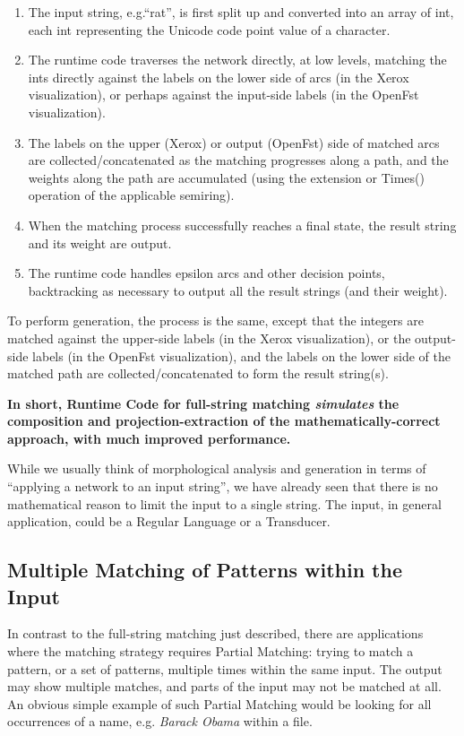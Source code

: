 \documentclass[letterpaper,12pt]{article}
\begin{document}
\begin{enumerate}
\item
The input string, e.g.\@ ``rat'',  is first split up and converted into an array of int, each int representing the Unicode code
point value of a character.
\item
The runtime code traverses the network directly, at low levels, matching the ints directly against the labels on
the lower side of arcs (in the Xerox visualization), or perhaps against the input-side labels (in the OpenFst
visualization).
\item
The labels on the upper (Xerox) or output (OpenFst) side of matched arcs are collected/concatenated as the matching progresses along a path, and the
weights along the path are accumulated (using the extension or Times() operation of the
applicable semiring).
\item
When the matching process successfully reaches a final state, the result string and its weight are
output.
\item
The runtime code handles epsilon arcs and other decision points, backtracking as necessary to output
all the result strings (and their weight).
\end{enumerate}

\noindent To perform generation, the process is the same, except that the integers are matched against the upper-side
labels (in the Xerox visualization), or the output-side labels (in the OpenFst visualization), and the labels on the
lower side of the matched path are collected/concatenated to form the result string(s).

{\bfseries In short, Runtime Code for full-string matching \emph{simulates} the composition and projection-extraction of the
mathematically-correct approach, with much improved performance.}

While we usually think of morphological analysis and generation in terms of ``applying a network to an input string'', we
have already seen that there is no mathematical reason to limit the input to a single string.  The input, in general
application, could be a Regular Language or a Transducer.

\subsection{Multiple Matching of Patterns within the Input}

In contrast to the full-string matching just described, there are applications where the matching strategy requires
Partial Matching: trying to match a pattern, or a set of patterns, multiple times within the same input.  The output may
show multiple matches, and parts of the input may not be matched at all.  An obvious simple example of such Partial
Matching would be looking for all occurrences of a name, e.g. \emph{Barack Obama} within a file.
\end{document}
